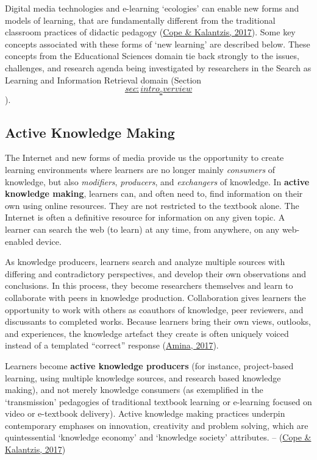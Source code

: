 \documentclass[a4paper, nobind]{templates/ociamthesis}
\begin{document}
Digital media technologies and e-learning `ecologies' can enable new
forms and models of learning, that are fundamentally different from the
traditional classroom practices of didactic pedagogy
(\protect\hyperlink{ref-cope2017elearningc}{Cope \& Kalantzis, 2017}). Some key concepts associated with these forms of
`new learning' are described below. These concepts from the Educational
Sciences domain tie back strongly to the issues, challenges, and
research agenda being investigated by researchers in the Search as
Learning and Information Retrieval domain (Section
\protect\hyperlink{sec:intro_overview}{\[sec:intro_overview\]}).

\hypertarget{sec:bg_learn_active_knowledge_making}{%
\subsection{Active Knowledge Making}\label{sec:bg_learn_active_knowledge_making}}

The Internet and new forms of media provide us the opportunity to create
learning environments where learners are no longer mainly \emph{consumers} of
knowledge, but also \emph{modifiers}, \emph{producers}, and \emph{exchangers} of
knowledge. In \textbf{active knowledge making}, learners can, and often need
to, find information on their own using online resources. They are not
restricted to the textbook alone. The Internet is often a definitive
resource for information on any given topic. A learner can search the
web (to learn) at any time, from anywhere, on any web-enabled device.

As knowledge producers, learners search and analyze multiple sources
with differing and contradictory perspectives, and develop their own
observations and conclusions. In this process, they become researchers
themselves and learn to collaborate with peers in knowledge production.
Collaboration gives learners the opportunity to work with others as
coauthors of knowledge, peer reviewers, and discussants to completed
works. Because learners bring their own views, outlooks, and
experiences, the knowledge artefact they create is often uniquely voiced
instead of a templated ``correct'' response (\protect\hyperlink{ref-amina2017active}{Amina, 2017}).

Learners become \textbf{active knowledge producers} (for instance,
project-based learning, using multiple knowledge sources, and research
based knowledge making), and not merely knowledge consumers (as
exemplified in the `transmission' pedagogies of traditional textbook
learning or e-learning focused on video or e-textbook delivery). Active
knowledge making practices underpin contemporary emphases on innovation,
creativity and problem solving, which are quintessential `knowledge
economy' and `knowledge society' attributes. -- (\protect\hyperlink{ref-cope2017elearningc}{Cope \& Kalantzis, 2017})
\end{document}
